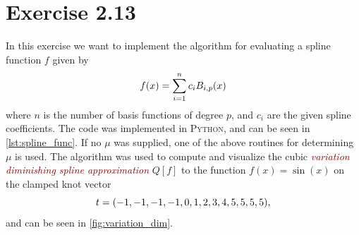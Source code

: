 \documentclass[a4paper]{article}
\let\oemph\emph
\renewcommand{\emph}[1]{\oemph{\textcolor{Maroon}{#1}}}}
\begin{document}
    \section*{Exercise 2.13} 

    In this exercise we want to implement the algorithm for evaluating a spline
    function $f$ given by
    \begin{equation}
        \notag
        f(x) = \sum^{n}_{i=1} c_i B_{i, p}(x)
    \end{equation}
    where $n$ is the number of basis functions of degree $p$, and $c_i$ are the
    given spline coefficients. The code was implemented in \textsc{Python}, and
    can be seen in \cref{lst:spline_func}. If no $\mu$ was supplied, one of the
    above routines for determining $\mu$ is used. The algorithm was used to
    compute and visualize the cubic \emph{variation diminishing spline
    approximation} $Q[f]$ to the function $f(x) = \sin(x)$ on the clamped knot
    vector
    \begin{equation}
        \notag
        t = (-1, -1, -1, -1, 0, 1, 2, 3, 4, 5, 5, 5, 5), 
    \end{equation}
    and can be seen in \cref{fig:variation_dim}.
\end{document}
